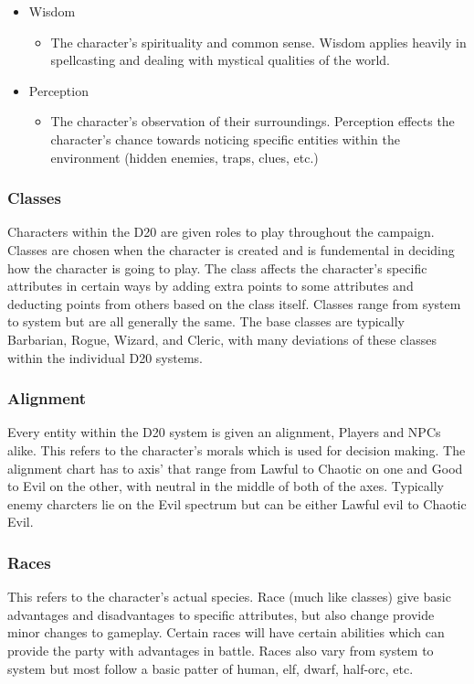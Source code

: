 \documentclass[12pt,a4paper]{report}
\begin{document}
\begin{itemize}
\begin{itemize}
			\end{itemize}
			\item Wisdom
			\begin{itemize}
				\item The character's spirituality and common sense. Wisdom applies heavily in spellcasting and dealing with mystical qualities of the world. 
			\end{itemize}
			\item Perception
			\begin{itemize}
				\item The character's observation of their surroundings. Perception effects the character's chance towards noticing specific entities within the environment (hidden enemies, traps, clues, etc.)
			\end{itemize}
		\end{itemize}
		\subsubsection{Classes}
			Characters within the D20 are given roles to play throughout the campaign. Classes are chosen when the character is created and is fundemental in deciding how the character is going to play. The class affects the character's specific attributes in certain ways by adding extra points to some attributes and deducting points from others based on the class itself. Classes range from system to system but are all generally the same. The base classes are typically Barbarian, Rogue, Wizard, and Cleric, with many deviations of these classes within the individual D20 systems.
		\subsubsection{Alignment}
			Every entity within the D20 system is given an alignment, Players and NPCs alike. This refers to the character's morals which is used for decision making. The alignment chart has to axis' that range from Lawful to Chaotic on one and Good to Evil on the other, with neutral in the middle of both of the axes. Typically enemy charcters lie on the Evil spectrum but can be either Lawful evil to Chaotic Evil. 
		\subsubsection{Races}
			This refers to the character's actual species. Race (much like classes) give basic advantages and disadvantages to specific attributes, but also change provide minor changes to gameplay. Certain races will have certain abilities which can provide the party with advantages in battle. Races also vary from system to system but most follow a basic patter of human, elf, dwarf, half-orc, etc.
\end{document}
